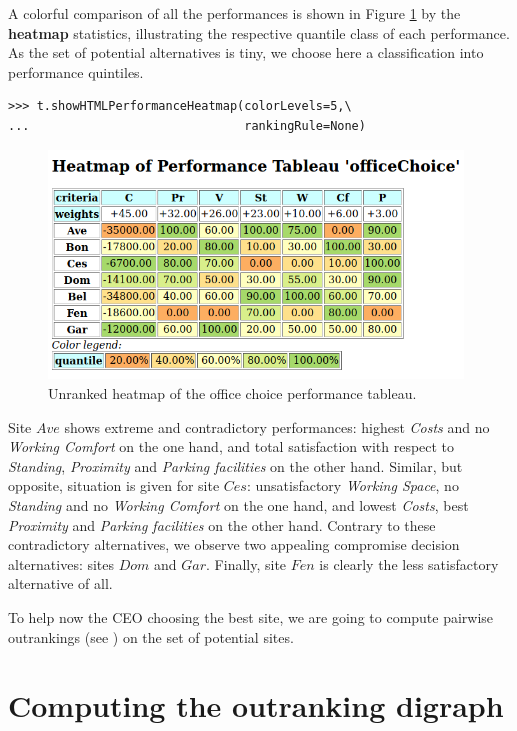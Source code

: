 A colorful comparison of all the performances is shown in Figure \ref{fig:6.1} by the \textbf{heatmap} statistics, illustrating the respective quantile class of each performance. As the set of potential alternatives is tiny, we choose here a classification into performance quintiles.

\begin{lstlisting}
>>> t.showHTMLPerformanceHeatmap(colorLevels=5,\
...                              rankingRule=None)
\end{lstlisting}
    
\begin{figure}[h]
\includegraphics[width=11cm]{Figures/officeChoiceHeatmap.png}
\caption{Unranked heatmap of the office choice performance tableau.}
\label{fig:6.1}       %
\end{figure}

Site $Ave$ shows extreme and contradictory performances: highest \emph{Costs} and no \emph{Working Comfort} on the one hand, and total satisfaction with respect to \emph{Standing}, \emph{Proximity} and \emph{Parking facilities} on the other hand. Similar, but opposite, situation is given for site $Ces$: unsatisfactory \emph{Working Space}, no \emph{Standing} and no \emph{Working Comfort} on the one hand, and lowest \emph{Costs}, best \emph{Proximity} and \emph{Parking facilities} on the other hand. Contrary to these contradictory alternatives, we observe two appealing compromise decision alternatives: sites $Dom$ and $Gar$. Finally, site $Fen$ is clearly the less satisfactory alternative of all.

To help now the CEO choosing the best site, we are going to compute pairwise outrankings (see \citep{BIS-2013}) on the set of potential sites.


\section{Computing the outranking digraph}
\label{sec:6.2}

